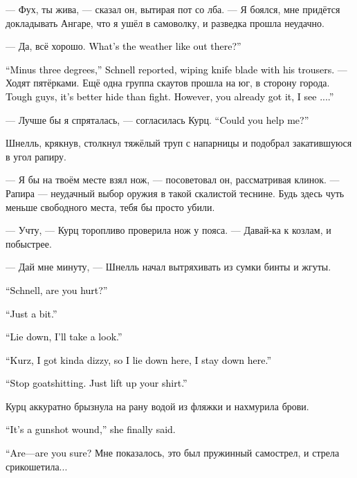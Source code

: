\documentclass[a4paper,12pt,fleqn]{book}\usepackage{cooltooltips}\usepackage{polyglossia}\setdefaultlanguage[babelshorthands=true]{russian}\setotherlanguage{english}\defaultfontfeatures{Ligatures=TeX,Mapping=tex-text} \usepackage{xcolor}\definecolor{lightgray}{HTML}{bbbbbb}\color{lightgray}\newcommand{\ml}[3]{\textenglish{\textcolor{black}{#3}}}
\begin{document}
--- Фух, ты жива, --- сказал он, вытирая пот со лба.
--- Я боялся, мне придётся докладывать Ангаре, что я ушёл в самоволку, и разведка прошла неудачно.

--- Да, всё хорошо.
\ml{$0$}
{Как у тебя погода?}
{What's the weather like out there?''}

\ml{$0$}
{--- На улице минус три, --- отрапортовал Шнелль, вытирая лезвие ножа о штаны.}
{``Minus three degrees,'' Schnell reported, wiping knife blade with his trousers.}
--- Ходят пятёрками.
Ещё одна группа скаутов прошла на юг, в сторону города.
\ml{$0$}
{Ребята очень жёсткие, лучше спрятаться, чем драться.}
{Tough guys, it's better hide than fight.}
\ml{$0$}
{Впрочем, ты и сама поняла, как я вижу...}
{However, you already got it, I see ....''}

--- Лучше бы я спряталась, --- согласилась Курц.
\ml{$0$}
{--- Можешь мне помочь?}
{``Could you help me?''}

Шнелль, крякнув, столкнул тяжёлый труп с напарницы и подобрал закатившуюся в угол рапиру.

--- Я бы на твоём месте взял нож, --- посоветовал он, рассматривая клинок.
--- Рапира --- неудачный выбор оружия в такой скалистой теснине.
Будь здесь чуть меньше свободного места, тебя бы просто убили.

--- Учту, --- Курц торопливо проверила нож у пояса.
--- Давай-ка к козлам, и побыстрее.

--- Дай мне минуту, --- Шнелль начал вытряхивать из сумки бинты и жгуты.

\ml{$0$}
{--- Шнелль, ты ранен?}
{``Schnell, are you hurt?''}

\ml{$0$}
{--- Самую малость.}
{``Just a bit.''}

\ml{$0$}
{--- Ложись, я осмотрю.}
{``Lie down, I'll take a look.''}

\ml{$0$}
{--- Курц, меня немного крутит, так что если я лягу --- я уже не встану.}
{``Kurz, I got kinda dizzy, so I lie down here, I stay down here.''}

\ml{$0$}
{--- Хватит нести чушь.}
{``Stop goatshitting.}
\ml{$0$}
{Просто подними рубаху.}
{Just lift up your shirt.''}

Курц аккуратно брызнула на рану водой из фляжки и нахмурила брови.

\ml{$0$}
{--- Это огнестрел, --- наконец выдала она.}
{``It's a gunshot wound,'' she finally said.}

\ml{$0$}
{--- Т-ты уверена?}
{``Are---are you sure?}
Мне показалось, это был пружинный самострел, и стрела срикошетила...
\end{document}
